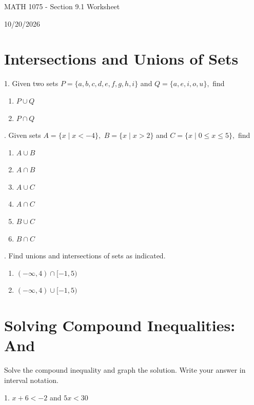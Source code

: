 \documentclass[12pt]{article}
\begin{document}
\vspace*{0.5in}

\begin{center}
    {\LARGE MATH 1075 - Section 9.1 Worksheet}

    \vspace{2em}

    {\large 10/20/2026}
\end{center}
\section{Intersections and Unions of Sets}
\vspace{1.5em}


1. Given two sets $P=\{a,b,c,d,e,f,g,h,i\}$ and $Q=\{a,e,i,o,u\},$ find

\begin{enumerate}[label=\alph*)]
\item $P\cup Q$
\item $P\cap Q$
\end{enumerate}

\vspace{10em}

. Given sets $A=\{x\mid x<-4\},$ $B=\{x\mid x>2\}$ and $C=\{x\mid 0\leq x\leq 5\},$ find 
\begin{enumerate}[label=\alph*)]
\item $A\cup B$
\item $A\cap B$
\item $A\cup C$
\item $A\cap C$
\item $B\cup C$
\item $B\cap C$
\end{enumerate}
\newpage 
{}. Find unions and intersections of sets as indicated. 
\begin{enumerate}[label=\alph*)]
\item $(-\infty, 4)\cap [-1,5)$
\item $(-\infty, 4)\cup [-1,5)$
\end{enumerate}
\section{Solving Compound Inequalities: And}

Solve the compound inequality and graph the solution. Write your answer in interval notation. 

\vspace{1.5em} 

1. $x+6<-2$ and $5x<30$
\end{document}
